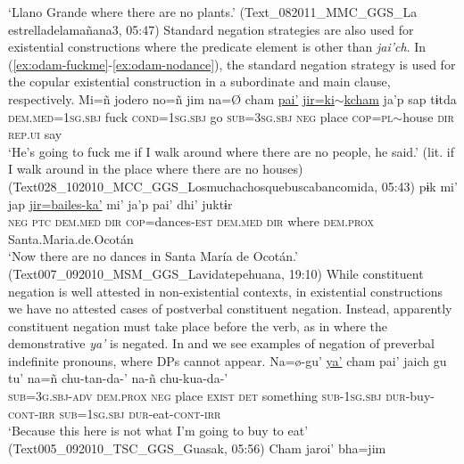 \documentclass[output=paper]{langsci/langscibook}
\begin{document}
\glt ‘Llano Grande where there are no plants.’ (Text\_082011\_MMC\_GGS\_La estrelladelamañana3, 05:47)
\z 
Standard negation strategies are also used for existential constructions where the predicate element is other than \emph{jai’ch}. In 
(\ref{ex:odam-fuckme}-\ref{ex:odam-nodance}), the standard negation strategy is used for the copular existential construction in a subordinate and main clause, respectively.
\ea
\label{ex:odam-fuckme}
\gll Mi=ñ 	jodero 	no=ñ	jim na=Ø 	cham 	\underline{pai’}	\underline{jir=ki$\sim$kcham} ja’p 	sap 	tɨtda\\
\textsc{dem.med=1sg.sbj}	fuck	\textsc{cond=1sg.sbj}	go	\textsc{sub=3sg.sbj}	\textsc{neg}	place	\textsc{cop=pl}$\sim$house		\textsc{dir}	\textsc{rep.ui}	say\\
\glt ‘He's going to fuck me if I walk around where there are no people, he said.’ (lit. if I walk around in the place where there are no houses) (Text028\_102010\_MCC\_GGS\_Losmuchachosquebuscabancomida, 05:43)
\z 
\ea
\label{ex:odam-nodance}
 	pɨk	mi' 	jap	\underline{jir=bailes-ka'}		mi'	ja’p	pai' dhi' 	juktɨr\\
\textsc{neg}		\textsc{ptc}	\textsc{dem.med}	\textsc{dir} 	\textsc{cop}=dances-\textsc{est} 	\textsc{dem.med} 	\textsc{dir} 	where \textsc{dem.prox}  	Santa.Maria.de.Ocotán\\
\glt ‘Now there are no dances in Santa María de Ocotán.’ (Text007\_092010\_MSM\_GGS\_Lavidatepehuana, 19:10)
\z 
While constituent negation is well attested in non-existential contexts, in existential constructions we have no attested cases of postverbal constituent negation. Instead, apparently constituent negation must take place before the verb, as in  where the demonstrative \emph{ya'} is negated. In  and  we see examples of negation of preverbal indefinite pronouns, where DPs cannot appear. 
\ea
\label{ex:odam-buyeat}
\gll Na=\o-gu’	\underline{ya'}	cham pai'  jaich 		gu  	tu' na=ñ             		chu-tan-da-'	na-ñ            	chu-kua-da-'\\
\textsc{sub=3g.sbj-adv}	\textsc{dem.prox} 	\textsc{neg}	place		\textsc{exist} 	\textsc{det}	something	 \textsc{sub-1sg.sbj}		\textsc{dur}-buy-\textsc{cont-irr}	\textsc{sub=1sg.sbj} \textsc{dur}-eat-\textsc{cont-irr}\\
\glt ‘Because this here is not what I’m going to buy to eat’ (Text005\_092010\_TSC\_GGS\_Guasak, 05:56)
\z 
\ea
\label{ex:odam-nobody}
\gll Cham	jaroi’ 		bha=jim\\
\end{document}

